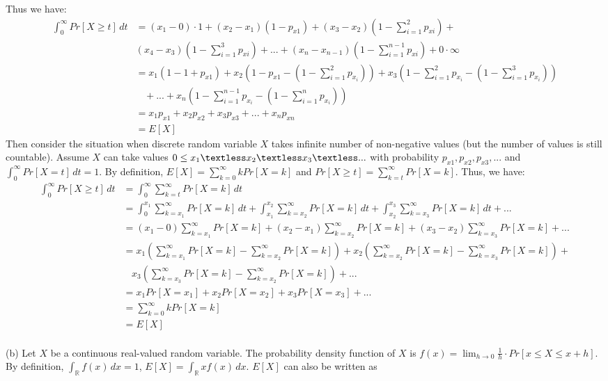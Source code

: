 Thus we have:
\begin{align}
  \nonumber\int_{0}^{\infty}Pr[X\ge t]\, dt &= (x_1-0)\cdot 1+(x_2-x_1) (1-p_{x1})+(x_3-x_2) (1-\sum_{i=1}^{2}p_{xi})+\\
  \nonumber&(x_4-x_3) (1-\sum_{i=1}^{3}p_{xi})+...+(x_n-x_{n-1})(1-\sum_{i=1}^{n-1}p_{xi})+0\cdot \infty\\
  \nonumber&=x_1(1-1+p_{x1})+x_2(1-p_{x1}-(1-\sum_{i=1}^2p_{x_i}))+x_3(1-\sum_{i=1}^2p_{x_i}-(1-\sum_{i=1}^3p_{x_i}))\\
  \nonumber&~~~~+...+x_n(1-\sum_{i=1}^{n-1}p_{x_i}-(1-\sum_{i=1}^np_{x_i}))\\
  \nonumber&=x_1p_{x1}+x_2p_{x2}+x_3p_{x3}+...+x_np_{xn}\\
  \nonumber&=E[X]
\end{align}
Then consider the situation when discrete random variable $X$ takes infinite number of non-negative values (but the number of values is still countable).
Assume $X$ can take values $0\le x_1\textless x_2 \textless x_3 \textless ...$ with probability $p_{x1},p_{x2},p_{x3},...$ and $\int_{0}^{\infty}Pr[X=t]\, dt=1$. By definition, $E[X]=\sum_{k=0}^{\infty}kPr[X=k]$ and $Pr[X\ge t]=\sum_{k=t}^{\infty}Pr[X=k]$. Thus, we have:
\begin{align}
  \nonumber\int_{0}^{\infty}Pr[X\ge t]\, dt &=\int_{0}^{\infty}\sum_{k=t}^{\infty}Pr[X=k] \, dt\\
  \nonumber&=\int_{0}^{x_1}\sum_{k=x_1}^{\infty}Pr[X=k] \, dt + \int_{x_1}^{x_2}\sum_{k=x_2}^{\infty}Pr[X=k] \, dt + \int_{x_2}^{x_3}\sum_{k=x_3}^{\infty}Pr[X=k] \, dt +...\\
  \nonumber&=(x_1-0)\sum_{k=x_1}^{\infty}Pr[X=k]+(x_2-x_1)\sum_{k=x_2}^{\infty}Pr[X=k]+(x_3-x_2)\sum_{k=x_3}^{\infty}Pr[X=k]+...\\
  \nonumber&=x_1(\sum_{k=x_1}^{\infty}Pr[X=k]-\sum_{k=x_2}^{\infty}Pr[X=k])+x_2(\sum_{k=x_2}^{\infty}Pr[X=k]-\sum_{k=x_3}^{\infty}Pr[X=k])+\\
  \nonumber&~~~~ x_3(\sum_{k=x_3}^{\infty}Pr[X=k]-\sum_{k=x_2}^{\infty}Pr[X=k])+...\\
  \nonumber&=x_1Pr[X=x_1]+x_2Pr[X=x_2]+x_3Pr[X=x_3]+...\\
  \nonumber &=\sum_{k=0}^{\infty}kPr[X=k]\\
  \nonumber &=E[X]
\end{align}
\\
(b)
Let $X$ be a continuous real-valued random variable. The probability density function of $X$ is $f(x)=\lim_{h \to 0} \frac{1}{h}\cdot Pr[x\le X \le x+h]$. By definition, $\int_{\mathbb{R}}f(x)\, dx=1$, $E[X]=\int_{\mathbb{R}}xf(x)\, dx$. $E[X]$ can also be written as
